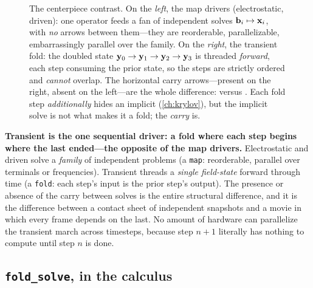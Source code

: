 \begin{figure}[p]
\caption[The map drivers versus the transient fold]{The centerpiece contrast. On
the \emph{left}, the map drivers (electrostatic, driven): one operator feeds a fan
of independent solves $\mathbf{b}_i\mapsto\mathbf{x}_i$, with \emph{no} arrows between them---they
are reorderable, parallelizable, embarrassingly parallel over the family. On the
\emph{right}, the transient fold: the doubled state $\mathbf{y}_0\to\mathbf{y}_1\to\mathbf{y}_2\to\mathbf{y}_3$
is threaded \emph{forward}, each step consuming the prior state, so the steps are
strictly ordered and \emph{cannot} overlap. The horizontal carry arrows---present on
the right, absent on the left---are the whole difference:  versus
. Each fold step \emph{additionally} hides an implicit
 (\cref{ch:krylov}), but the implicit solve is not what makes it a
fold; the \emph{carry} is.}
\label{fig:tr-foldvmap}
\end{figure}

\begin{keyidea}
\textbf{Transient is the one sequential driver: a fold where each step begins where
the last ended---the opposite of the map drivers.} Electrostatic and driven solve a
\emph{family} of independent problems (a \texttt{map}: reorderable, parallel over
terminals or frequencies). Transient threads a \emph{single field-state} forward
through time (a \texttt{fold}: each step's input is the prior step's output). The
presence or absence of the carry between solves is the entire structural
difference, and it is the difference between a contact sheet of independent
snapshots and a movie in which every frame depends on the last. No amount of
hardware can parallelize the transient march across timesteps, because step $n+1$
literally has nothing to compute until step $n$ is done.
\end{keyidea}

\subsection{\texttt{fold\_solve}, in the calculus}

